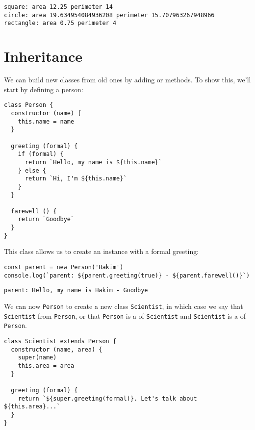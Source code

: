 \begin{verbatim}
square: area 12.25 perimeter 14
circle: area 19.634954084936208 perimeter 15.707963267948966
rectangle: area 0.75 perimeter 4
\end{verbatim}

\section{Inheritance}\label{s:oop-inheritance}

We can build new classes from old ones
by adding or  methods.
To show this,
we'll start by defining a person:

\begin{verbatim}
class Person {
  constructor (name) {
    this.name = name
  }

  greeting (formal) {
    if (formal) {
      return `Hello, my name is ${this.name}`
    } else {
      return `Hi, I'm ${this.name}`
    }
  }

  farewell () {
    return `Goodbye`
  }
}
\end{verbatim}

This class allows us to create an instance with a formal greeting:

\begin{verbatim}
const parent = new Person('Hakim')
console.log(`parent: ${parent.greeting(true)} - ${parent.farewell()}`)
\end{verbatim}

\begin{verbatim}
parent: Hello, my name is Hakim - Goodbye
\end{verbatim}

We can now  \texttt{Person}
to create a new class \texttt{Scientist},
in which case we say that \texttt{Scientist}  from \texttt{Person},
or that \texttt{Person} is a  of \texttt{Scientist}
and \texttt{Scientist} is a  of \texttt{Person}.

\begin{verbatim}
class Scientist extends Person {
  constructor (name, area) {
    super(name)
    this.area = area
  }

  greeting (formal) {
    return `${super.greeting(formal)}. Let's talk about ${this.area}...`
  }
}
\end{verbatim}

